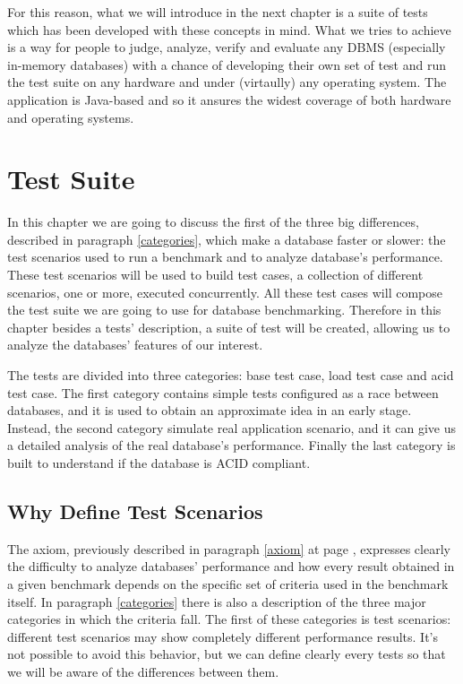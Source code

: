 For this reason, what we will introduce in the next chapter is a suite of tests which has been developed with these concepts in mind. What we tries to achieve is a way for people to judge, analyze, verify and evaluate any DBMS (especially in-memory databases) with a chance of developing their own set of test and run the test suite on any hardware and under (virtaully) any operating system. The application is Java-based and so it ansures the widest coverage of both hardware and operating systems.


\chapter{Test Suite} \label{test-suite}	
In this chapter we are going to discuss the first of the three big differences, described in paragraph \ref{categories}, which make a database faster or slower: the test scenarios used to run a benchmark and to analyze database's performance. These test scenarios will be used to build test cases, a collection of different scenarios, one or more, executed concurrently. All these test cases will compose the test suite we are going to use for database benchmarking. Therefore in this chapter besides a tests' description, a suite of test will be created, allowing us to analyze the databases' features of our interest. 

The tests are divided into three categories: base test case, load test case and acid test case. The first category contains simple tests configured as a race between databases, and it is used to obtain an approximate idea in an early stage. Instead, the second category simulate real application scenario, and it can give us a detailed analysis of the real database's performance. Finally the last category is built to understand if the database is ACID compliant.


	\section{Why Define Test Scenarios}
The axiom, previously described in paragraph \ref{axiom} at page \pageref{axiom}, expresses clearly the difficulty to analyze databases' performance and how every result obtained in a given benchmark depends on the specific set of criteria used in the benchmark itself. In paragraph \ref{categories} there is also a description of the three major categories in which the criteria fall. The first of these categories is test scenarios: different test scenarios may show completely different performance results. It's not possible to avoid this behavior, but we can define clearly every tests so that we will be aware of the differences between them. 


